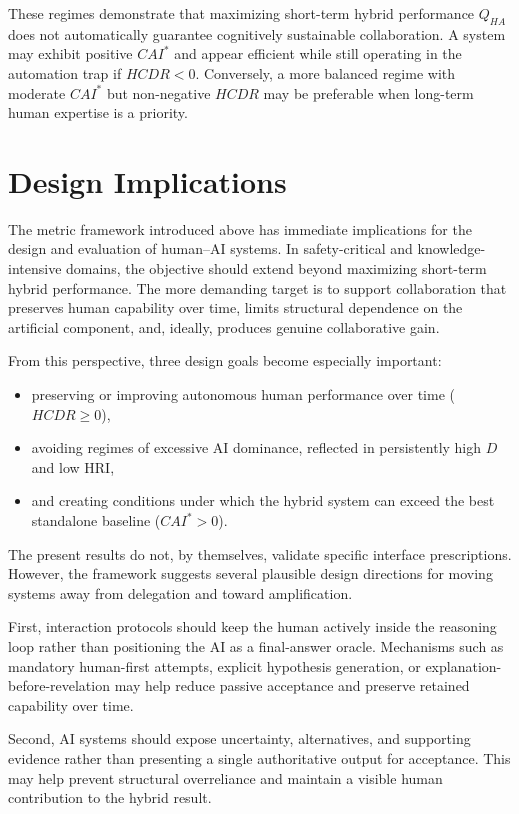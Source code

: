 \documentclass[11pt,a4paper]{article}
\begin{document}
These regimes demonstrate that maximizing short-term hybrid performance $Q_{HA}$ does not automatically guarantee cognitively sustainable collaboration. A system may exhibit positive $CAI^*$ and appear efficient while still operating in the automation trap if $HCDR < 0$. Conversely, a more balanced regime with moderate $CAI^*$ but non-negative $HCDR$ may be preferable when long-term human expertise is a priority.

\section{Design Implications}

The metric framework introduced above has immediate implications for the design and evaluation of human--AI systems. In safety-critical and knowledge-intensive domains, the objective should extend beyond maximizing short-term hybrid performance. The more demanding target is to support collaboration that preserves human capability over time, limits structural dependence on the artificial component, and, ideally, produces genuine collaborative gain.

From this perspective, three design goals become especially important:
\begin{itemize}
\item preserving or improving autonomous human performance over time ($HCDR \ge 0$),
\item avoiding regimes of excessive AI dominance, reflected in persistently high $D$ and low HRI,
\item and creating conditions under which the hybrid system can exceed the best standalone baseline ($CAI^* > 0$).
\end{itemize}

The present results do not, by themselves, validate specific interface prescriptions. However, the framework suggests several plausible design directions for moving systems away from delegation and toward amplification.

First, interaction protocols should keep the human actively inside the reasoning loop rather than positioning the AI as a final-answer oracle. Mechanisms such as mandatory human-first attempts, explicit hypothesis generation, or explanation-before-revelation may help reduce passive acceptance and preserve retained capability over time.\cite{cognitive-offloading,designing-ai-expertise,ai-pitfalls}

Second, AI systems should expose uncertainty, alternatives, and supporting evidence rather than presenting a single authoritative output for acceptance. This may help prevent structural overreliance and maintain a visible human contribution to the hybrid result.\cite{human-ai-uq,uncertainty-explainability,ai-cognitive-implications}
\end{document}
